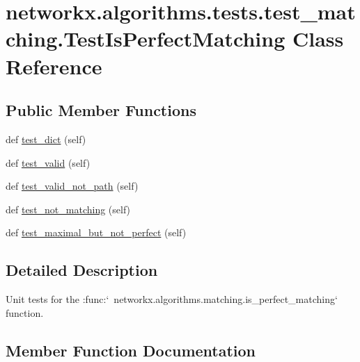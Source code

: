 \hypertarget{classnetworkx_1_1algorithms_1_1tests_1_1test__matching_1_1TestIsPerfectMatching}{}\section{networkx.\+algorithms.\+tests.\+test\+\_\+matching.\+Test\+Is\+Perfect\+Matching Class Reference}
\label{classnetworkx_1_1algorithms_1_1tests_1_1test__matching_1_1TestIsPerfectMatching}
\subsection*{Public Member Functions}
\begin{DoxyCompactItemize}
\item 
def \hyperlink{classnetworkx_1_1algorithms_1_1tests_1_1test__matching_1_1TestIsPerfectMatching_a452b267d372e065bf0b220936bf6d945}{test\+\_\+dict} (self)
\item 
def \hyperlink{classnetworkx_1_1algorithms_1_1tests_1_1test__matching_1_1TestIsPerfectMatching_afcc0ca9610033f5c9bab96322bf4c37a}{test\+\_\+valid} (self)
\item 
def \hyperlink{classnetworkx_1_1algorithms_1_1tests_1_1test__matching_1_1TestIsPerfectMatching_ae98dff769f2a79d0917c4951a1e6f6f7}{test\+\_\+valid\+\_\+not\+\_\+path} (self)
\item 
def \hyperlink{classnetworkx_1_1algorithms_1_1tests_1_1test__matching_1_1TestIsPerfectMatching_a06306d5b4d001a71ba321111c5a8731e}{test\+\_\+not\+\_\+matching} (self)
\item 
def \hyperlink{classnetworkx_1_1algorithms_1_1tests_1_1test__matching_1_1TestIsPerfectMatching_ace2947f6e55a10328ca33f146bd8800f}{test\+\_\+maximal\+\_\+but\+\_\+not\+\_\+perfect} (self)
\end{DoxyCompactItemize}


\subsection{Detailed Description}
\begin{DoxyVerb}Unit tests for the
:func:`~networkx.algorithms.matching.is_perfect_matching` function.\end{DoxyVerb}
 

\subsection{Member Function Documentation}
\mbox{\label{classnetworkx_1_1algorithms_1_1tests_1_1test__matching_1_1TestIsPerfectMatching_a452b267d372e065bf0b220936bf6d945}} 
